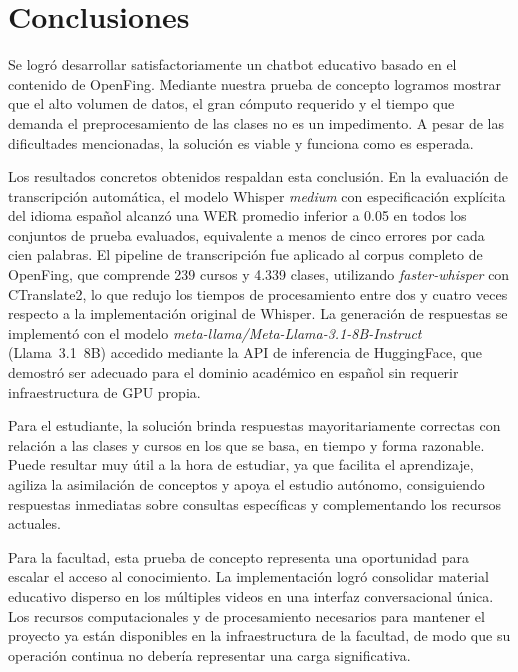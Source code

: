 \chapter{Conclusiones}
\label{chapter:8-Conclusiones}

Se logró desarrollar satisfactoriamente un chatbot educativo basado en el contenido de OpenFing. Mediante nuestra prueba de concepto logramos mostrar que el alto volumen de datos, el gran cómputo requerido y el tiempo que demanda el preprocesamiento de las clases no es un impedimento. A pesar de las dificultades mencionadas, la solución es viable y funciona como es esperada.

Los resultados concretos obtenidos respaldan esta conclusión. En la evaluación de transcripción automática, el modelo Whisper \textit{medium} con especificación explícita del idioma español alcanzó una WER promedio inferior a 0.05 en todos los conjuntos de prueba evaluados, equivalente a menos de cinco errores por cada cien palabras. El pipeline de transcripción fue aplicado al corpus completo de OpenFing, que comprende 239 cursos y 4.339 clases, utilizando \textit{faster-whisper} con CTranslate2, lo que redujo los tiempos de procesamiento entre dos y cuatro veces respecto a la implementación original de Whisper. La generación de respuestas se implementó con el modelo \textit{meta-llama/Meta-Llama-3.1-8B-Instruct} (Llama~3.1~8B) accedido mediante la API de inferencia de HuggingFace, que demostró ser adecuado para el dominio académico en español sin requerir infraestructura de GPU propia.

Para el estudiante, la solución brinda respuestas mayoritariamente correctas con relación a las clases y cursos en los que se basa, en tiempo y forma razonable. Puede resultar muy útil a la hora de estudiar, ya que facilita el aprendizaje, agiliza la asimilación de conceptos y apoya el estudio autónomo, consiguiendo respuestas inmediatas sobre consultas específicas y complementando los recursos actuales.

Para la facultad, esta prueba de concepto representa una oportunidad para escalar el acceso al conocimiento. La implementación logró consolidar material educativo disperso en los múltiples videos en una interfaz conversacional única. Los recursos computacionales y de procesamiento necesarios para mantener el proyecto ya están disponibles en la infraestructura de la facultad, de modo que su operación continua no debería representar una carga significativa.

